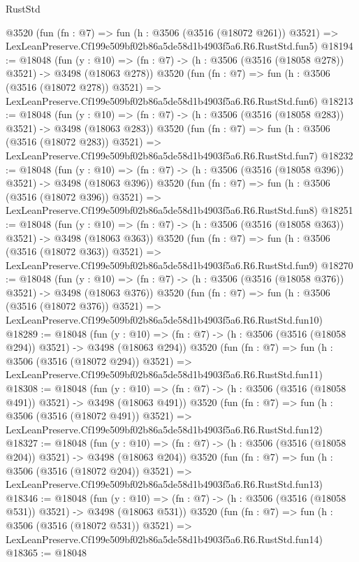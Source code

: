\begin{lexlean}{RustStd}
\begin{coremodule}
    @3520
    (fun (fn : @7) =>
    fun (h : @3506 (@3516 (@18072 @261)) @3521) =>
    LexLeanPreserve.Cf199e509bf02b86a5de58d1b4903f5a6.R6.RustStd.fun5)
@18194 := @18048
    (fun (y : @10) => (fn : @7) -> (h : @3506 (@3516 (@18058 @278)) @3521) -> @3498 (@18063 @278))
    @3520
    (fun (fn : @7) =>
    fun (h : @3506 (@3516 (@18072 @278)) @3521) =>
    LexLeanPreserve.Cf199e509bf02b86a5de58d1b4903f5a6.R6.RustStd.fun6)
@18213 := @18048
    (fun (y : @10) => (fn : @7) -> (h : @3506 (@3516 (@18058 @283)) @3521) -> @3498 (@18063 @283))
    @3520
    (fun (fn : @7) =>
    fun (h : @3506 (@3516 (@18072 @283)) @3521) =>
    LexLeanPreserve.Cf199e509bf02b86a5de58d1b4903f5a6.R6.RustStd.fun7)
@18232 := @18048
    (fun (y : @10) => (fn : @7) -> (h : @3506 (@3516 (@18058 @396)) @3521) -> @3498 (@18063 @396))
    @3520
    (fun (fn : @7) =>
    fun (h : @3506 (@3516 (@18072 @396)) @3521) =>
    LexLeanPreserve.Cf199e509bf02b86a5de58d1b4903f5a6.R6.RustStd.fun8)
@18251 := @18048
    (fun (y : @10) => (fn : @7) -> (h : @3506 (@3516 (@18058 @363)) @3521) -> @3498 (@18063 @363))
    @3520
    (fun (fn : @7) =>
    fun (h : @3506 (@3516 (@18072 @363)) @3521) =>
    LexLeanPreserve.Cf199e509bf02b86a5de58d1b4903f5a6.R6.RustStd.fun9)
@18270 := @18048
    (fun (y : @10) => (fn : @7) -> (h : @3506 (@3516 (@18058 @376)) @3521) -> @3498 (@18063 @376))
    @3520
    (fun (fn : @7) =>
    fun (h : @3506 (@3516 (@18072 @376)) @3521) =>
    LexLeanPreserve.Cf199e509bf02b86a5de58d1b4903f5a6.R6.RustStd.fun10)
@18289 := @18048
    (fun (y : @10) => (fn : @7) -> (h : @3506 (@3516 (@18058 @294)) @3521) -> @3498 (@18063 @294))
    @3520
    (fun (fn : @7) =>
    fun (h : @3506 (@3516 (@18072 @294)) @3521) =>
    LexLeanPreserve.Cf199e509bf02b86a5de58d1b4903f5a6.R6.RustStd.fun11)
@18308 := @18048
    (fun (y : @10) => (fn : @7) -> (h : @3506 (@3516 (@18058 @491)) @3521) -> @3498 (@18063 @491))
    @3520
    (fun (fn : @7) =>
    fun (h : @3506 (@3516 (@18072 @491)) @3521) =>
    LexLeanPreserve.Cf199e509bf02b86a5de58d1b4903f5a6.R6.RustStd.fun12)
@18327 := @18048
    (fun (y : @10) => (fn : @7) -> (h : @3506 (@3516 (@18058 @204)) @3521) -> @3498 (@18063 @204))
    @3520
    (fun (fn : @7) =>
    fun (h : @3506 (@3516 (@18072 @204)) @3521) =>
    LexLeanPreserve.Cf199e509bf02b86a5de58d1b4903f5a6.R6.RustStd.fun13)
@18346 := @18048
    (fun (y : @10) => (fn : @7) -> (h : @3506 (@3516 (@18058 @531)) @3521) -> @3498 (@18063 @531))
    @3520
    (fun (fn : @7) =>
    fun (h : @3506 (@3516 (@18072 @531)) @3521) =>
    LexLeanPreserve.Cf199e509bf02b86a5de58d1b4903f5a6.R6.RustStd.fun14)
@18365 := @18048

\end{coremodule}
\end{lexlean}
